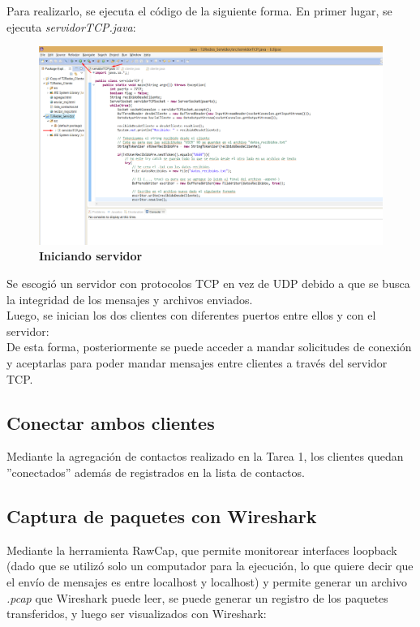 \documentclass[12pt]{article}
\begin{document}
Para realizarlo, se ejecuta el código de la siguiente forma. En primer lugar, se ejecuta \emph{servidorTCP.java}:

\begin{figure}[H] 
\centering 
\includegraphics[width=1\textwidth]{imagenes/1.png} \caption{\small \textbf{Iniciando servidor}} 
\label{fig:diagrama_1} 
\end{figure}

Se escogió un servidor con protocolos TCP en vez de UDP debido a que se busca la integridad de los mensajes y archivos enviados.\\

Luego, se inician los dos clientes con diferentes puertos entre ellos y con el servidor:\\

De esta forma, posteriormente se puede acceder a mandar solicitudes de conexión y aceptarlas para poder mandar mensajes entre clientes a través del servidor TCP.

\subsection{Conectar ambos clientes}

Mediante la agregación de contactos realizado en la Tarea 1, los clientes quedan ''conectados'' además de registrados en la lista de contactos.\\

\subsection{Captura de paquetes con Wireshark}

Mediante la herramienta RawCap, que permite monitorear interfaces loopback (dado que se utilizó solo un computador para la ejecución, lo que quiere decir que el envío de mensajes es entre localhost y localhost) y permite generar un archivo \emph{.pcap} que Wireshark puede leer, se puede generar un registro de los paquetes transferidos, y luego ser visualizados con Wireshark:
\end{document}
